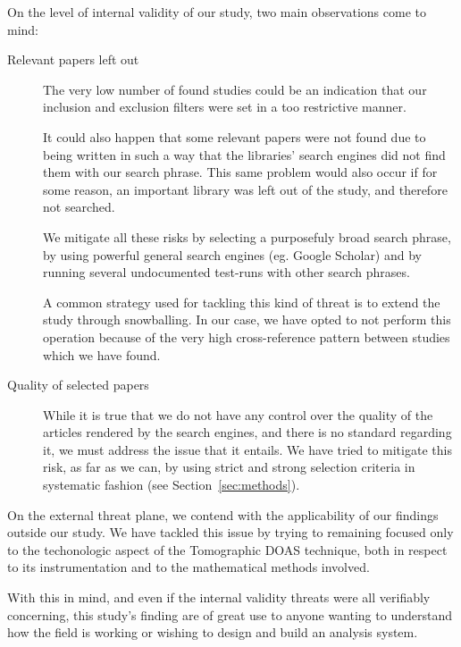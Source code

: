 On the level of internal validity of our study, two main observations
come to mind:
\begin{description}
    
    \item[Relevant papers left out] The very low number of found studies
        could be an indication that our inclusion and exclusion filters
        were set in a too restrictive manner. 
        
        It could also happen that some relevant papers were not found
        due to being written in such a way that the libraries' search
        engines did not find them with our search phrase. This same
        problem would also occur if for some reason, an important
        library was left out of the study, and therefore not searched.

        We mitigate all these risks by selecting a purposefuly broad
        search phrase, by using powerful general search engines (eg.
        Google Scholar) and by running several undocumented test-runs
        with other search phrases.

        A common strategy used for tackling this kind of threat is to
        extend the study through snowballing. In our case, we have opted
        to not perform this operation because of the very high
        cross-reference pattern between studies which we have found.
    
    \item[Quality of selected papers] While it is true that we do not
        have any control over the quality of the articles rendered by
        the search engines, and there is no standard regarding it, we
        must address the issue that it entails. We have tried to
        mitigate this risk, as far as we can, by using strict and strong
        selection criteria in systematic fashion (see
        Section~\ref{sec:methods}).

\end{description}

On the external threat plane, we contend with the applicability of our
findings outside our study. We have tackled this issue by trying to
remaining focused only to the techonologic aspect of the Tomographic
DOAS technique, both in respect to its instrumentation and to the
mathematical methods involved.

With this in mind, and even if the internal validity threats were all
verifiably concerning, this study's finding are of great use to anyone
wanting to understand how the field is working or wishing to design and
build an analysis system.
